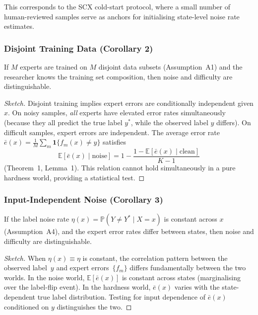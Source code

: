 This corresponds to the SCX cold-start protocol, where a small number of
human-reviewed samples serve as anchors for initialising state-level noise
rate estimates.

\subsubsection{Disjoint Training Data (Corollary 2)}
\label{sec:corollary2}

\begin{corollary}
  If $M$ experts are trained on $M$ disjoint data subsets (Assumption~A1)
  and the researcher knows the training set composition, then noise and
  difficulty are distinguishable.
\end{corollary}

\begin{proof}[Sketch]
  Disjoint training implies expert errors are conditionally independent given
  $x$.  On noisy samples, \emph{all} experts have elevated error rates
  simultaneously (because they all predict the true label $y^*$, while the
  observed label $y$ differs).  On difficult samples, expert errors are
  independent.  The average error rate
  $\bar{e}(x)=\frac1M\sum_m\mathbf{1}\{f_m(x)\neq y\}$ satisfies
  \[
  \mathbb{E}[\bar{e}(x)\mid\text{noise}]
  = 1-\frac{1-\mathbb{E}[\bar{e}(x)\mid\text{clean}]}{K-1}
  \]
  (Theorem~1, Lemma~1).  This relation cannot hold simultaneously in a pure
  hardness world, providing a statistical test.
\end{proof}

\subsubsection{Input-Independent Noise (Corollary 3)}
\label{sec:corollary3}

\begin{corollary}
  If the label noise rate $\eta(x)=\mathbb{P}(Y\neq Y^*\mid X=x)$ is
  constant across $x$ (Assumption~A4), and the expert error rates differ
  between states, then noise and difficulty are distinguishable.
\end{corollary}

\begin{proof}[Sketch]
  When $\eta(x)\equiv\eta$ is constant, the correlation pattern between the
  observed label~$y$ and expert errors~$\{f_m\}$ differs fundamentally
  between the two worlds.  In the noise world, $\mathbb{E}[\bar{e}(x)]$ is
  constant across states (marginalising over the label-flip event).  In the
  hardness world, $\bar{e}(x)$ varies with the state-dependent true label
  distribution.  Testing for input dependence of $\bar{e}(x)$ conditioned on
  $y$ distinguishes the two.
\end{proof}

